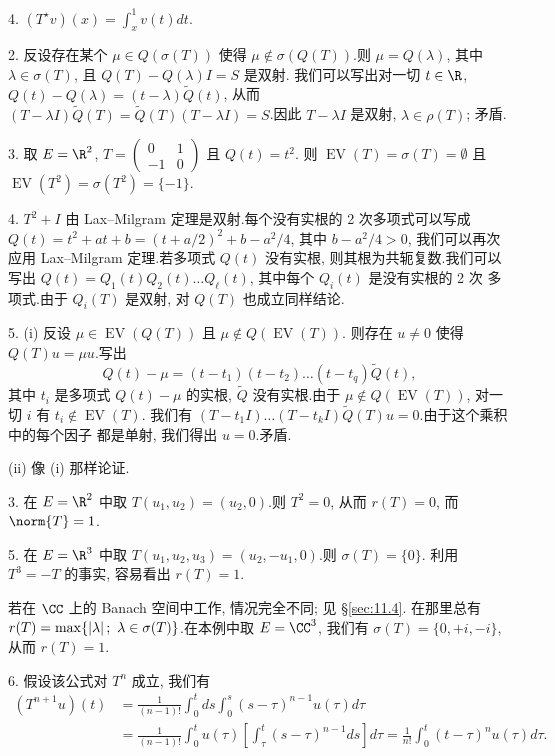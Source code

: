 4. $(T^\star v)(x)=\int_x^1v(t)dt$.


2. 反设存在某个 $\mu\in Q(\sigma(T))$ 使得 $\mu\notin\sigma(Q(T))$.则
$\mu=Q(\lambda)$, 其中 $\lambda\in\sigma(T)$, 且 $Q(T)-Q(\lambda)I=S$ 是双射.
我们可以写出对一切 $t\in\R$, $Q(t)-Q(\lambda)=(t-\lambda)\widetilde Q(t)$,
从而 $(T-\lambda I)\widetilde Q(T)=\widetilde Q(T)(T-\lambda I)=S$.因此
$T-\lambda I$ 是双射, $\lambda\in\rho(T)$; 矛盾.

3. 取 $E=\R^2$, $T=\begin{pmatrix}0&1\\-1&0\end{pmatrix}$ 且 $Q(t)=t^2$.
则 $\operatorname{EV}(T)=\sigma(T)=\emptyset$ 且
$\operatorname{EV}(T^2)=\sigma(T^2)=\{-1\}$.

4. $T^2+I$ 由 Lax--Milgram 定理是双射.每个没有实根的 2 次多项式可以写成
$Q(t)=t^2+at+b=(t+a/2)^2+b-a^2/4$, 其中 $b-a^2/4>0$, 我们可以再次应用
Lax--Milgram 定理.若多项式 $Q(t)$ 没有实根, 则其根为共轭复数.我们可以写出
$Q(t)=Q_1(t)Q_2(t)\dots Q_\ell(t)$, 其中每个 $Q_i(t)$ 是没有实根的 2 次
多项式.由于 $Q_i(T)$ 是双射, 对 $Q(T)$ 也成立同样结论.

5. (i) 反设 $\mu\in\operatorname{EV}(Q(T))$ 且 $\mu\notin Q(\operatorname{EV}(T))$.
则存在 $u\ne0$ 使得 $Q(T)u=\mu u$.写出
\begin{equation*}
Q(t)-\mu=(t-t_1)(t-t_2)\dots(t-t_q)\widetilde Q(t),
\end{equation*}
其中 $t_i$ 是多项式 $Q(t)-\mu$ 的实根, $\widetilde Q$ 没有实根.由于
$\mu\notin Q(\operatorname{EV}(T))$, 对一切 $i$ 有 $t_i\notin\operatorname{EV}(T)$.
我们有 $(T-t_1I)\dots(T-t_kI)\widetilde Q(T)u=0$.由于这个乘积中的每个因子
都是单射, 我们得出 $u=0$.矛盾.

(ii) 像 (i) 那样论证.


3. 在 $E=\R^2$ 中取 $T(u_1,u_2)=(u_2,0)$.则 $T^2=0$, 从而 $r(T)=0$, 而 $\norm{T}=1$.

5. 在 $E=\R^3$ 中取 $T(u_1,u_2,u_3)=(u_2,-u_1,0)$.则 $\sigma(T)=\{0\}$.
利用 $T^3=-T$ 的事实, 容易看出 $r(T)=1$.

 若在 $\CC$ 上的 Banach 空间中工作, 情况完全不同; 见 \S \ref{sec:11.4}.
在那里总有 $r(T)=\max\{\abs{\lambda};\ \lambda\in\sigma(T)\}$.在本例中取
$E=\CC^3$, 我们有 $\sigma(T)=\{0,+i,-i\}$, 从而 $r(T)=1$.

6. 假设该公式对 $T^n$ 成立, 我们有
\begin{align*}
(T^{n+1}u)(t)&=\frac{1}{(n-1)!}\int_0^tds\int_0^s(s-\tau)^{n-1}u(\tau)d\tau\\
&=\frac{1}{(n-1)!}\int_0^tu(\tau)\left[\int_\tau^t(s-\tau)^{n-1}ds\right]d\tau
=\frac{1}{n!}\int_0^t(t-\tau)^nu(\tau)d\tau.
\end{align*}

